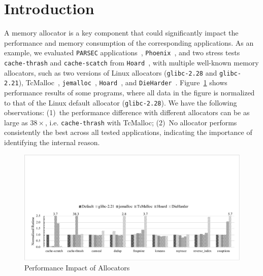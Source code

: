 

\section{Introduction}
\label{sec:intro}

A memory allocator is a key component that could significantly impact the performance and memory consumption of the corresponding applications. As an example, we evaluated \texttt{PARSEC} applications~\cite{parsec}, \texttt{Phoenix}~\cite{phoenix}, and two stress tests  \texttt{cache-thrash} and \texttt{cache-scatch} from \texttt{Hoard}~\cite{Hoard}, with multiple well-known memory allocators, such as two versions of Linux allocators (\texttt{glibc-2.28} and \texttt{glibc-2.21}), TcMalloc~\cite{tcmalloc}, \texttt{jemalloc}~\cite{jemalloc},  \texttt{Hoard}~\cite{Hoard}, and \texttt{DieHarder}~\cite{DieHarder}. Figure~\ref{fig:motivation} shows performance results of some programs, where all data in the figure is normalized to that of the Linux default allocator (\texttt{glibc-2.28}). We have the following observations: (1)~the performance difference with different allocators can be as large as $38\times$, i.e. \texttt{cache-thrash} with TcMalloc; (2)~No allocator performs consistently the best across all tested applications, indicating the importance of identifying the internal reason.

\begin{figure}[!ht]
\centering
\includegraphics[width=0.98\columnwidth]{figures/motivation}
\caption{Performance Impact of Allocators\label{fig:motivation}}
\end{figure}

